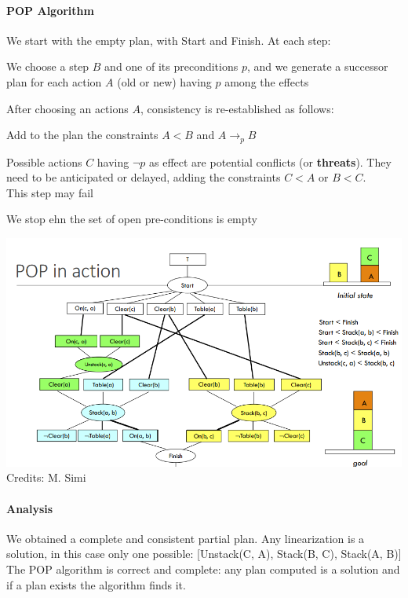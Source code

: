 \documentclass[10pt]{report}
\begin{document}
\paragraph{POP Algorithm} We start with the empty plan, with Start and Finish. At each step:
\begin{list}{}{}
	\item We choose a step $B$ and one of its preconditions $p$, and we generate a successor plan for each action $A$ (old or new) having $p$ among the effects
	\item After choosing an actions $A$, consistency is re-established as follows:
	\begin{list}{}{}
		\item Add to the plan the constraints $A<B$ and $A\rightarrow_p B$
		\item Possible actions $C$ having $\neg p$ as effect are potential conflicts (or \textbf{threats}). They need to be anticipated or delayed, adding the constraints $C< A$ or $B < C$.\\
		This step may fail
	\end{list}
	\item We stop ehn the set of open pre-conditions is empty
\end{list}
\begin{center}
	\includegraphics[scale=0.65]{29.png}\\
	Credits: M. Simi
\end{center}
\paragraph{Analysis} We obtained a complete and consistent partial plan. Any linearization is a solution, in this case only one possible: [Unstack(C, A), Stack(B, C), Stack(A, B)]\\
The POP algorithm is correct and complete: any plan computed is a solution and if a plan exists the algorithm finds it.
\end{document}
